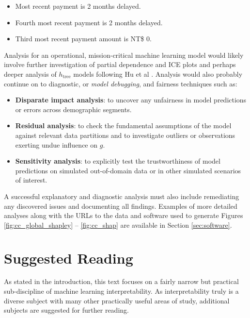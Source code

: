 \documentclass[11pt]{asaproc}
\begin{document}
\begin{itemize}

\item Most recent payment is 2 months delayed.
\item Fourth most recent payment is 2 months delayed.
\item Third most recent payment amount is NT\$ 0.

\end{itemize} 

Analysis for an operational, mission-critical machine learning model would likely involve further investigation of partial dependence and ICE plots and perhaps deeper analysis of $h_{\text{tree}}$ models following Hu et al \cite{lime-sup}. Analysis would also probably continue on to diagnostic, or \textit{model debugging}, and fairness techniques such as:

\begin{itemize}

\item \textbf{Disparate impact analysis}: to uncover any unfairness in model predictions or errors across demographic segments.
\item \textbf{Residual analysis}: to check the fundamental assumptions of the model against relevant data partitions and to investigate outliers or observations exerting undue influence on $g$. 
\item \textbf{Sensitivity analysis}: to explicitly test the trustworthiness of model predictions on simulated out-of-domain data or in other simulated scenarios of interest.  

\end{itemize} 

\noindent A successful explanatory and diagnostic analysis must also include remediating any discovered issues and documenting all findings. Examples of more detailed analyses along with the URLs to the data and software used to generate Figures \ref{fig:cc_global_shapley} -- \ref{fig:cc_shap} are available in Section \ref{sec:software}.

\section{Suggested Reading} \label{sec:suggested}

As stated in the introduction, this text focuses on a fairly narrow but practical sub-discipline of machine learning interpretability. As interpretability truly is a diverse subject with many other practically useful areas of study, additional subjects are suggested for further reading.
\end{document}
